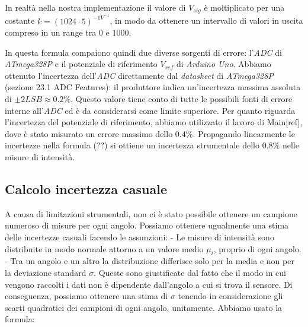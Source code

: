   \noindent In realtà nella nostra implementazione il valore di $V_{sig}$ è
  moltiplicato per una costante $k = (1024 \cdot 5)^{-1 V^{-1}}$, in modo
  da ottenere un intervallo di valori in uscita compreso in un range tra $0$ e
  $1000$. %

  In questa formula compaiono quindi due diverse sorgenti di errore:
  l'\emph{ADC} di \emph{ATmega328P} e il potenziale di riferimento $V_{ref}$
  di \emph{Arduino Uno}.
  Abbiamo ottenuto l’incertezza dell’\emph{ADC} direttamente dal
  \emph{datasheet} di \emph{ATmega328P} (sezione 23.1 ADC  Features): %
  il produttore indica un'incertezza massima assoluta di $\pm 2LSB \approx 0.2\%$. %
  Questo valore tiene conto di tutte le possibili fonti di errore interne
  all’\emph{ADC} ed è da considerarsi come limite superiore.
  Per quanto riguarda l'incertezza del potenziale di riferimento, abbiamo
  utilizzato il lavoro di Main[ref], dove è stato misurato un errore %
  massimo dello $0.4\%$.
  Propagando linearmente le incertezze nella formula (??) si ottiene un incertezza
  strumentale dello $0.8\%$ nelle misure di intensità.

\subsection{Calcolo incertezza casuale}\label{subsec:calcolo-incertezza-casuale}
  A causa di limitazioni strumentali, non ci è stato possibile ottenere un campione
  numeroso di misure per ogni angolo. Possiamo ottenere ugualmente
  una stima delle incertezze casuali facendo le assunzioni: %
  - Le misure di intensità sono distribuite in modo normale attorno a un valore
    medio $\mu_i$, proprio di ogni angolo.
  - Tra un angolo e un altro la distribuzione differisce solo per la media e non per la
    deviazione standard $\sigma$.
  Queste sono giustificate dal fatto che il modo in cui vengono raccolti i dati
  non è dipendente dall'angolo a cui si trova il sensore.
  Di conseguenza, possiamo ottenere una stima di $\sigma$ tenendo in considerazione
  gli scarti quadratici dei campioni di ogni angolo, unitamente.
  Abbiamo usato la formula:

